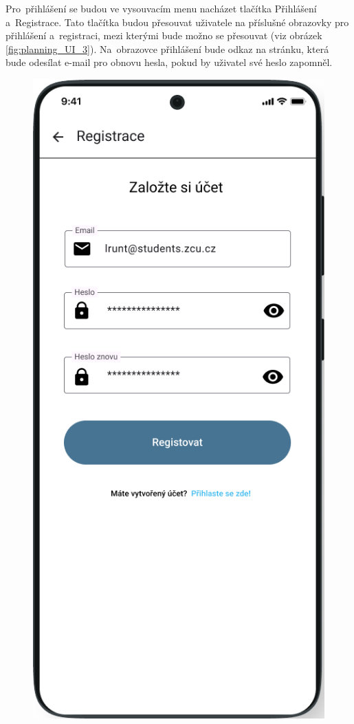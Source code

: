 \documentclass[czech, bc, kiv, he, iso690numb]{fasthesis}
\begin{document}
\newpage
Pro~přihlášení se budou ve vysouvacím menu nacházet tlačítka Přihlášení a~Registrace. Tato tlačítka budou přesouvat uživatele na příslušné obrazovky pro přihlášení a~registraci, mezi kterými bude možno se přesouvat (viz obrázek \ref{fig:planning_UI_3}). Na~obrazovce přihlášení bude odkaz na stránku, která bude odesílat e-mail pro obnovu hesla, pokud by uživatel své heslo zapomněl.   


\begin{figure}[h!]
  \centering
  \begin{minipage}[h]{0.30\textwidth}
    \includegraphics[width=\textwidth]{img/BP-Runt/Planning/UI/Registrace_edited.png}

\end{minipage}
\end{figure}
\end{document}
